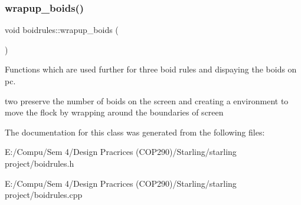 \subsubsection{\texorpdfstring{wrapup\+\_\+boids()}{wrapup\_boids()}}
{\footnotesize\ttfamily void boidrules\+::wrapup\+\_\+boids (\begin{DoxyParamCaption}{ }\end{DoxyParamCaption})}



Functions which are used further for three boid rules and dispaying the boids on pc. 

two preserve the number of boids on the screen and creating a environment to move the flock by wrapping around the boundaries of screen 

The documentation for this class was generated from the following files\+:\begin{DoxyCompactItemize}
\item 
E\+:/\+Compu/\+Sem 4/\+Design Pracrices (\+C\+O\+P290)/\+Starling/starling project/boidrules.\+h\item 
E\+:/\+Compu/\+Sem 4/\+Design Pracrices (\+C\+O\+P290)/\+Starling/starling project/boidrules.\+cpp\end{DoxyCompactItemize}
